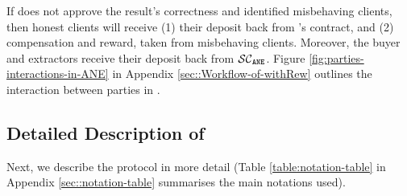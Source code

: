 If \scf does not approve the result's correctness and \aud identified misbehaving clients, then honest clients will receive (1) their deposit back from \fpsi's contract, and (2)  compensation and reward, taken from misbehaving clients. Moreover, the buyer and extractors receive their deposit back from $\mathcal{SC}_{\mathtt{ANE}}$. Figure \ref{fig:parties-interactions-in-ANE} in Appendix \ref{sec::Workflow-of-withRew} outlines the interaction between parties in \withRew. 















 \vspace{-3.4mm}
\subsection{Detailed Description of \epsi} 
 \vspace{-1mm}

Next, we describe the protocol in more detail (Table \ref{table:notation-table} in Appendix \ref{sec::notation-table} summarises the main notations used). 



